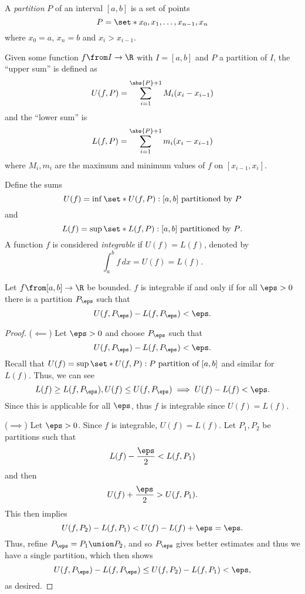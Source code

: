 \documentclass{article}
\begin{document}

\begin{defn}[Partition]
  A \emph{partition} $P$ of an interval $[a, b]$ is a set of points
  \[ P = \set*{x_{0}, x_{1}, \ldots, x_{n - 1}, x_{n}} \]
  where $x_{0} = a$, $x_{n} = b$ and $x_{i} > x_{i - 1}$.
\end{defn}

\begin{defn}
  Given some function $f \from I \to \R$  with $I = [a, b]$ and $P$ a partition of $I$,
  the ``upper sum'' is defined as
  \[ U(f, P) = \sum_{i = 1}^{\abs{P} + 1} M_{i}(x_{i} - x_{i - 1}) \]
  and the ``lower sum'' is
  \[ L(f, P) = \sum_{i = 1}^{\abs{P} + 1} m_{i}(x_{i} - x_{i - 1}) \]
  where $M_{i}, m_{i}$ are the maximum and minimum values of $f$ on $[x_{i - 1}, x_{i}]$.
\end{defn}

\begin{defn}
  Define the sums
  \[ U(f) = \inf\set*{U(f, P) : [a, b] \text{ partitioned by } P} \]
  and
  \[ L(f) = \sup\set*{L(f, P) : [a, b] \text{ partitioned by } P}. \]
  A function $f$ is considered \emph{integrable} if $U(f) = L(f)$, denoted by
  \[ \int_{a}^{b} f \, dx = U(f) = L(f). \]
\end{defn}

\begin{theorem}
  Let $f \from [a, b] \to \R$ be bounded.
  $f$ is integrable if and only if for all $\eps > 0$
  there is a partition $P_{\eps}$ such that
  \[ U(f, P_{\eps}) - L(f, P_{\eps}) < \eps. \]
\end{theorem}
\begin{proof}
  ($\impliedby$) Let $\eps > 0$ and choose $P_{\eps}$ such that
  \[ U(f, P_{\eps}) - L(f, P_{\eps}) < \eps. \]
  Recall that $U(f) = \sup\set*{U(f, P) : P \text{ partition of } [a, b]}$
  and similar for $L(f)$. Thus, we can see
  \[ L(f) \ge L(f, P_{\eps}), U(f) \le U(f, P_{\eps}) \implies U(f) - L(f) < \eps. \]
  Since this is applicable for all $\eps$, thus $f$ is integrable since $U(f) = L(f)$.

  ($\implies$) Let $\eps > 0$. Since $f$ is integrable, $U(f) = L(f)$.
  Let $P_{1}, P_{2}$ be partitions such that
  \[ L(f) - \frac{\eps}{2} < L(f, P_{1}) \]
  and then
  \[ U(f) + \frac{\eps}{2} > U(f, P_{1}). \]
  This then implies
  \[ U(f, P_{2}) - L(f, P_{1}) < U(f) - L(f) + \eps = \eps. \]
  Thus, refine $P_{\eps} = P_{1} \union P_{2}$, and so $P_{\eps}$ gives better estimates and thus we have a single partition, which then shows
  \[ U(f, P_{\eps}) - L(f, P_{\eps}) \le U(f, P_{2}) - L(f, P_{1}) < \eps, \]
  as desired.
\end{proof}
\end{document}
